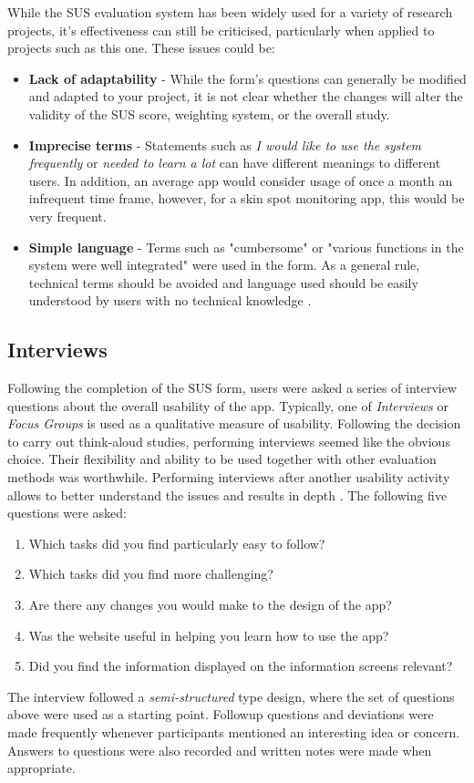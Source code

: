 While the SUS evaluation system has been widely used for a variety of research projects, it's effectiveness can still be criticised, particularly when applied to projects such as this one. These issues could be:
\begin{itemize}
    \item \textbf{Lack of adaptability} - While the form's questions can generally be modified and adapted to your project, it is not clear whether the changes will alter the validity of the SUS score, weighting system, or the overall study.
    \item \textbf{Imprecise terms} - Statements such as \emph{I would like to use the system frequently} or \emph{needed to learn a lot} can have different meanings to different users. In addition, an average app would consider usage of once a month an infrequent time frame, however, for a skin spot monitoring app, this would be very frequent.
    \item \textbf{Simple language} - Terms such as "cumbersome" or "various functions in the system were well integrated" were used in the form. As a general rule, technical terms should be avoided and language used should be easily understood by users with no technical knowledge \cite{harrison2007tip}.
\end{itemize}

\subsection{Interviews}
Following the completion of the SUS form, users were asked a series of interview questions about the overall usability of the app. Typically, one of \emph{Interviews} or \emph{Focus Groups} is used as a qualitative measure of usability. Following the decision to carry out think-aloud studies, performing interviews seemed like the obvious choice. Their flexibility and ability to be used together with other evaluation methods was worthwhile. Performing interviews after another usability activity allows to better understand the issues and results in depth \cite{courage2005understanding}.
The following five questions were asked:
\begin{enumerate}
    \item Which tasks did you find particularly easy to follow?
    \item Which tasks did you find more challenging?
    \item Are there any changes you would make to the design of the app?
    \item Was the website useful in helping you learn how to use the app?
    \item Did you find the information displayed on the information screens relevant?
\end{enumerate}
The interview followed a \emph{semi-structured} type design, where the set of questions above were used as a starting point. Followup questions and deviations were made frequently whenever participants mentioned an interesting idea or concern. Answers to questions were also recorded and written notes were made when appropriate.

